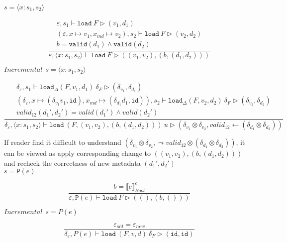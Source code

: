 \documentclass[10pt,twoside,a4paper]{article}
\theoremstyle{theorem}
\theoremstyle{lemma}
\theoremstyle{property}
\theoremstyle{definition}
\theoremstyle{assumption}
\def\id{\mathtt{id}}
\begin{document}
$\boxed{s = \langle x : s_1, s_2 \rangle}$

\begin{displaymath}
	\frac{\begin{array}{c}
		\varepsilon, s_1 \vdash \mathtt{load}~F \rhd (v_1,d_1)\\
		(\varepsilon, x \mapsto v_1, x_{md} \mapsto v_2), s_2 \vdash \mathtt{load}~F \rhd (v_2,d_2)\\
		b = \mathtt{valid}(d_1) \land \mathtt{valid}(d_2)
	\end{array}}
	{\varepsilon, \langle x : s_1, s_2 \rangle \vdash \mathtt{load}~F \rhd ((v_1, v_2),(b,(d_1,d_2))) }
\end{displaymath}

$\boxed{Incremental~~s = \langle x : s_1, s_2 \rangle}$

\begin{displaymath}
	\frac{\begin{array}{c}
		\delta_\varepsilon, s_1 \vdash \mathtt{load}_\Delta (F,v_1,d_1)~ \delta_F \rhd (\delta_{v_1},\delta_{d_1})\\
		(\delta_\varepsilon, x \mapsto (\delta_{v_1} v_1, \id), x_{md} \mapsto (\delta_{d_1} d_1, \id)), s_2 \vdash \mathtt{load}_\Delta (F,v_2,d_2)~ \delta_F \rhd (\delta_{v_2},\delta_{d_2})\\
		valid_{12}({d_1}',{d_2}') = valid({d_1}') \wedge valid({d_2}')
	\end{array}}
	{\delta_\varepsilon, \langle x:s_1,s_2 \rangle \vdash \mathtt{load}~ (F,(v_1,v_2),(b,(d_1,d_2)))~ u \rhd (\delta_{v_1} \otimes \delta_{v_2},valid_{12} \leftarrow (\delta_{d_1} \otimes \delta_{d_2})) }
\end{displaymath}

If reader find it difficult to understand $(\delta_{v_1} \otimes \delta_{v_2},\leadsto valid_{12} \otimes (\delta_{d_1} \otimes \delta_{d_2}))$, it can be viewed as apply corresponding change to $((v_1,v_2),(b,(d_1,d_2)))$ and recheck the correctness of new metadata $({d_1}', {d_2}')$\\

$\boxed{s = \mathtt{P}(e)}$

\begin{displaymath}
	\frac
	{b = \llbracket e \rrbracket^{\varepsilon}_{Bool}}
	{\varepsilon, \mathtt{P}(e) \vdash \mathtt{load}~F \rhd ((),(b,()))}
\end{displaymath}

$\boxed{Incremental~~s = P(e)}$

\begin{displaymath}
	\frac{ \varepsilon_{old} = \varepsilon_{new}}
	{\delta_\varepsilon, P(e) \vdash \mathtt{load}~ (F,v,d) ~\delta_F \rhd (\id, \id)}
\end{displaymath}
\end{document}

